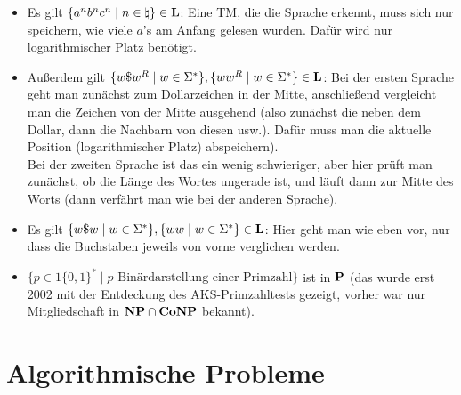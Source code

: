 \begin{Bsp}
    \begin{itemize}
        \item
        Es gilt $\{a^n b^n c^n \;|\; n \in \natural\} \in \L$:
        Eine TM, die die Sprache erkennt, muss sich nur speichern, wie viele $a$'s am Anfang
        gelesen wurden.
        Dafür wird nur logarithmischer Platz benötigt.

        \item
        Außerdem gilt $\{w \dollar w^R \;|\; w \in \Sigma^\ast\},
        \{w w^R \;|\; w \in \Sigma^\ast\} \in \L$:
        Bei der ersten Sprache geht man zunächst zum Dollarzeichen in der Mitte,
        anschließend vergleicht man die Zeichen
        von der Mitte ausgehend (also zunächst die neben dem Dollar, dann die Nachbarn von
        diesen usw.).
        Dafür muss man die aktuelle Position (logarithmischer Platz) abspeichern).\\
        Bei der zweiten Sprache ist das ein wenig schwieriger, aber hier prüft man zunächst,
        ob die Länge des Wortes ungerade ist, und läuft dann zur Mitte des Worts
        (dann verfährt man wie bei der anderen Sprache).

        \item
        Es gilt $\{w \dollar w \;|\; w \in \Sigma^\ast\},
        \{w w \;|\; w \in \Sigma^\ast\} \in \L$:
        Hier geht man wie eben vor, nur dass die Buchstaben jeweils von vorne verglichen werden.

        \item
        $\{p \in 1\{0, 1\}^\ast \;|\; p \text{ Binärdarstellung einer Primzahl}\}$ ist in $\P$
        (das wurde erst 2002 mit der Entdeckung des AKS-Primzahltests
        gezeigt, vorher war nur Mitgliedschaft in $\NP \cap \Co\NP$ bekannt).
    \end{itemize}
\end{Bsp}

\section{%
    Algorithmische Probleme%
}

